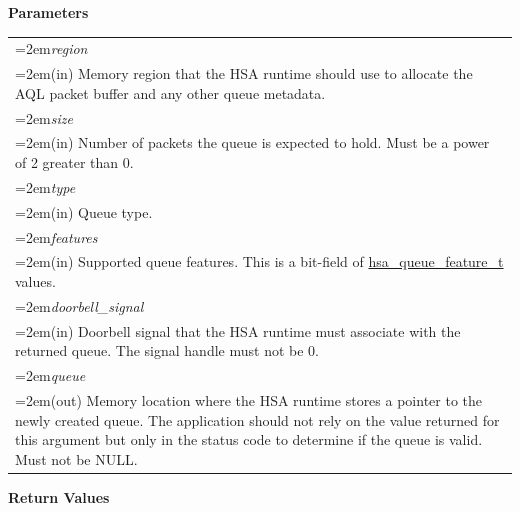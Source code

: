 \documentclass[final,oneside]{book}
\newcommand{\refarg}[1]{\textit{#1}}
\begin{document}
\vspace{-3.5mm}\hspace*{-.3mm}\textbf{Parameters}\\[-7mm]
\noindent\begin{longtable}{@{}>{\hangindent=2em}p{\textwidth}}
\refarg{region}\\\hspace{2em}(in) Memory region that the HSA runtime should use to allocate the AQL packet buffer and any other queue metadata.\\[2mm]
\refarg{size}\\\hspace{2em}(in) Number of packets the queue is expected to hold. Must be a power of 2 greater than 0.\\[2mm]
\refarg{type}\\\hspace{2em}(in) Queue type.\\[2mm]
\refarg{features}\\\hspace{2em}(in) Supported queue features. This is a bit-field of \hyperlink{group__queue_1ga1145b01f6d9e2670179a22c92db39413}{hsa_\-queue_\-feature_\-t} values.\\[2mm]
\refarg{doorbell_\-signal}\\\hspace{2em}(in) Doorbell signal that the HSA runtime must associate with the returned queue. The signal handle must not be 0.\\[2mm]
\refarg{queue}\\\hspace{2em}(out) Memory location where the HSA runtime stores a pointer to the newly created queue. The application should not rely on the value returned for this argument but only in the status code to determine if the queue is valid. Must not be NULL.
\end{longtable}
\vspace{-2mm}\textbf{Return Values}\\[-7mm]
\end{document}
